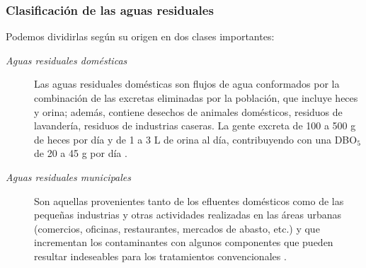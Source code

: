 \subsubsection*{Clasificación de las aguas residuales}
Podemos dividirlas según su origen en dos clases importantes:
\begin{description}
\item[\textit{Aguas residuales domésticas}]
Las aguas residuales domésticas son flujos de agua conformados por la combinación de las excretas eliminadas por la población, que incluye heces y orina; además, contiene desechos de animales domésticos, residuos de lavandería, residuos de industrias caseras. La gente excreta de 100 a 500 g de heces por día y de 1 a 3 L de orina al día, contribuyendo con una DBO$_{5}$ de 20 a 45 g por día \emph{\citep{carreno17}}. 
\item[\textit{Aguas residuales municipales}]
Son aquellas provenientes tanto de los efluentes domésticos como de las pequeñas industrias y otras actividades realizadas en las áreas urbanas (comercios, oficinas, restaurantes, mercados de abasto, etc.) y que incrementan los contaminantes con algunos componentes que pueden resultar indeseables para los tratamientos convencionales \emph{\citep{carreno17}}.
\end{description}

